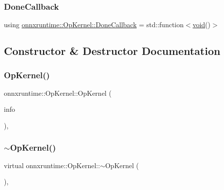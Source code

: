 \subsubsection{\texorpdfstring{Done\+Callback}{DoneCallback}}
{\footnotesize\ttfamily using \mbox{\hyperlink{classonnxruntime_1_1OpKernel_adee0f70567925d90c35b3c5b92ee87ac}{onnxruntime\+::\+Op\+Kernel\+::\+Done\+Callback}} =  std\+::function$<$\mbox{\hyperlink{mlasi_8h_a88f941d423cb2a819b70a1358982b1a6}{void}}()$>$}



\subsection{Constructor \& Destructor Documentation}
\mbox{\label{classonnxruntime_1_1OpKernel_ac52aa827444ff6e04e3eb307ca1c25ff}} 
\subsubsection{\texorpdfstring{Op\+Kernel()}{OpKernel()}}
{\footnotesize\ttfamily onnxruntime\+::\+Op\+Kernel\+::\+Op\+Kernel (\begin{DoxyParamCaption}\item[{const \mbox{\hyperlink{classonnxruntime_1_1OpKernelInfo}{Op\+Kernel\+Info}} \&}]{info }\end{DoxyParamCaption})\hspace{0.3cm}{\ttfamily [inline]}, {\ttfamily [explicit]}}

\mbox{\label{classonnxruntime_1_1OpKernel_a7c4cd72264d9eddc5363c3d51d14375b}} 
\subsubsection{\texorpdfstring{$\sim$\+Op\+Kernel()}{~OpKernel()}}
{\footnotesize\ttfamily virtual onnxruntime\+::\+Op\+Kernel\+::$\sim$\+Op\+Kernel (\begin{DoxyParamCaption}{ }\end{DoxyParamCaption})\hspace{0.3cm}{\ttfamily [virtual]}, {\ttfamily [default]}}



